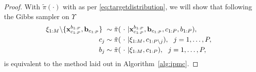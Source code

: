 \begin{proof}
	With $\tilde\pi(\cdot)$ with as per \eqref{eq:targetdistribution}, we will show that following the Gibbs sampler on $\Upsilon$
	\begin{subequations}
		\label{eq:gibbs}
		\begin{align}
		\mathbf{\xi}_{1:M} \backslash\{\mathbf{x}_{c_{1:P}}^{b_{1:P}}, \mathbf{b}_{c_{1:P}} \} ~&\sim \tilde \pi(~\cdot~|\mathbf{x}_{c_{1:P}}^{b_{1:P}}, \mathbf{b}_{c_{1:P}},c_{1:P}, b_{1:P})\label{eq:particles},\\
		c_j &\sim \tilde \pi(~\cdot~|\mathbf{\xi}_{1:M}, c_{1:P\backslash j}), ~~j=1,\ldots,P,\label{eq:worker}\\
		b_j &\sim \tilde \pi(~\cdot~|\mathbf{\xi}_{1:M}, c_{1:P}), ~~j=1,\ldots,P,\label{eq:index}
		\end{align}
	\end{subequations}
	is equivalent to the \ipmcmc method laid out in Algorithm~\ref{alg:ipmc}.
	

\end{proof}
